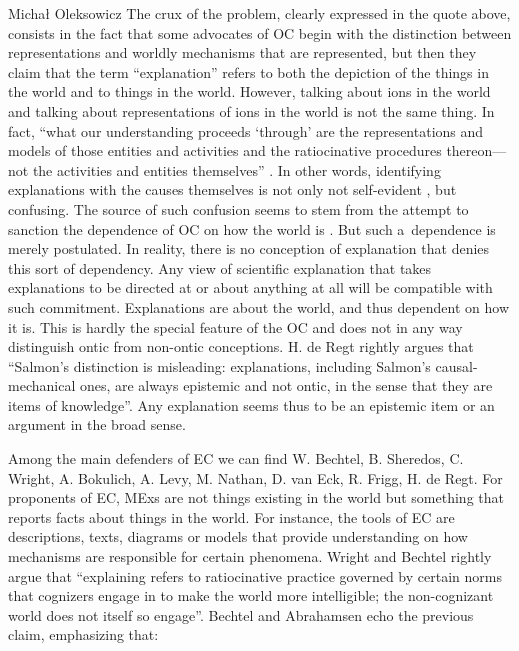 \begin{artengenv}{Michał Oleksowicz}
The crux of the problem, clearly expressed in the quote above, consists in the fact that some advocates of OC begin with the distinction between representations and worldly mechanisms that are represented, but then they claim that the term ``explanation'' refers to both the depiction of the things in the world and to things in the world. However, talking about ions in the world and talking about representations of ions in the world is not the same thing. In fact, ``what our understanding proceeds ‘through' are the representations and models of those entities and activities and the ratiocinative procedures thereon---not the activities and entities themselves''
\parencite[][p.26]{wright_ontic_2015}. %
 In other words, identifying explanations with the causes themselves is not only not self-evident 
\parencite[][]{wright_ontic_2018}, %
 but confusing. The source of such confusion seems to stem from the attempt to sanction the dependence of OC on how the world is 
\parencite[][]{kaiser_ontic_2014}. %
 But such a~dependence is merely postulated. In reality, there is no conception of explanation that denies this sort of dependency. Any view of scientific explanation that takes explanations to be directed at or about anything at all will be compatible with such commitment. Explanations are about the world, and thus dependent on how it is. This is hardly the special feature of the OC and does not in any way distinguish ontic from non-ontic conceptions. H. de Regt 
\parencite*[][p.24]{de_regt_understanding_2017} %
 rightly argues that ``Salmon's distinction is misleading: explanations, including Salmon's causal-mechanical ones, are always epistemic and not ontic, in the sense that they are items of knowledge''. Any explanation seems thus to be an epistemic item or an argument in the broad sense.

Among the main defenders of EC we can find W. Bechtel, B. Sheredos, C. Wright, A. Bokulich, A. Levy, M. Nathan, D. van Eck, R. Frigg, H. de Regt. For proponents of EC, MExs are not things existing in the world but something that reports facts about things in the world. For instance, the tools of EC are descriptions, texts, diagrams or models that provide understanding on how mechanisms are responsible for certain phenomena. Wright and Bechtel
\parencite*[][p.51]{wright_mechanisms_2007} %
 rightly argue that ``explaining refers to ratiocinative practice governed by certain norms that cognizers engage in to make the world more intelligible; the non-cognizant world does not itself so engage''. Bechtel and Abrahamsen 
\parencite*[][p.425]{bechtel_explanation_2005} %
 echo the previous claim, emphasizing that:


\end{artengenv}
